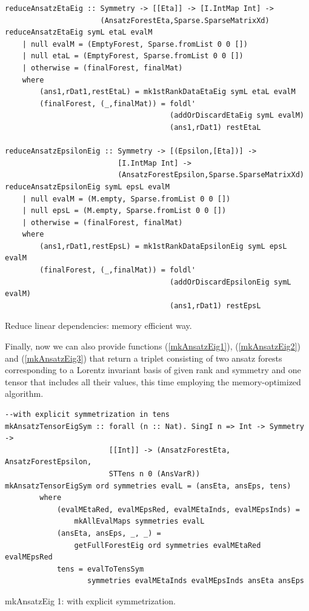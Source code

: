 \documentclass[a4paper,12pt, DIV=14, BCOR=5mm, twoside, headsepline, numbers=noenddot]{scrbook}
\begin{document}
\begin{listing}[hbt!]
\begin{verbatim}
reduceAnsatzEtaEig :: Symmetry -> [[Eta]] -> [I.IntMap Int] ->
                      (AnsatzForestEta,Sparse.SparseMatrixXd)
reduceAnsatzEtaEig symL etaL evalM
    | null evalM = (EmptyForest, Sparse.fromList 0 0 [])
    | null etaL = (EmptyForest, Sparse.fromList 0 0 [])
    | otherwise = (finalForest, finalMat)
    where
        (ans1,rDat1,restEtaL) = mk1stRankDataEtaEig symL etaL evalM
        (finalForest, (_,finalMat)) = foldl' 
                                      (addOrDiscardEtaEig symL evalM)
                                      (ans1,rDat1) restEtaL

reduceAnsatzEpsilonEig :: Symmetry -> [(Epsilon,[Eta])] ->
                          [I.IntMap Int] ->
                          (AnsatzForestEpsilon,Sparse.SparseMatrixXd)
reduceAnsatzEpsilonEig symL epsL evalM
    | null evalM = (M.empty, Sparse.fromList 0 0 [])
    | null epsL = (M.empty, Sparse.fromList 0 0 [])
    | otherwise = (finalForest, finalMat)
    where
        (ans1,rDat1,restEpsL) = mk1stRankDataEpsilonEig symL epsL evalM
        (finalForest, (_,finalMat)) = foldl'
                                      (addOrDiscardEpsilonEig symL evalM)
                                      (ans1,rDat1) restEpsL
\end{verbatim} 
\caption{Reduce linear dependencies: memory efficient way.}\label{redMem}
\end{listing}

Finally, now we can also provide functions (\ref{mkAnsatzEig1}), (\ref{mkAnsatzEig2}) and (\ref{mkAnsatzEig3}) that return a triplet consisting of two ansatz forests corresponding to a Lorentz invariant basis of given rank and symmetry and one tensor that includes all their values, this time employing the memory-optimized algorithm. 

\begin{listing}[hbt!]
\begin{verbatim}
--with explicit symmetrization in tens
mkAnsatzTensorEigSym :: forall (n :: Nat). SingI n => Int -> Symmetry ->
                        [[Int]] -> (AnsatzForestEta, AnsatzForestEpsilon,
                        STTens n 0 (AnsVarR))
mkAnsatzTensorEigSym ord symmetries evalL = (ansEta, ansEps, tens)
        where
            (evalMEtaRed, evalMEpsRed, evalMEtaInds, evalMEpsInds) =
                mkAllEvalMaps symmetries evalL 
            (ansEta, ansEps, _, _) =
                getFullForestEig ord symmetries evalMEtaRed evalMEpsRed
            tens = evalToTensSym
                   symmetries evalMEtaInds evalMEpsInds ansEta ansEps
\end{verbatim} 
\caption{mkAnsatzEig 1: with explicit symmetrization.}\label{mkAnsatzEig1}
\end{listing}
\end{document}
